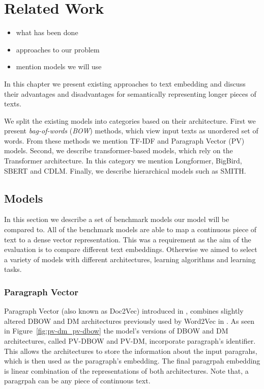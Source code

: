 \chapter{Related Work}

\begin{itemize}
    \item what has been done
    \item approaches to our problem
    \item mention models we will use
\end{itemize}

In this chapter we present existing approaches to text embedding and discuss
their advantages and disadvantages for semantically representing longer pieces
of texts.

We split the existing models into categories based on their architecture. First
we present \emph{bag-of-words} (\emph{BOW}) methods, which view input texts as
unordered set of words. From these methods we mention TF-IDF and Paragraph
Vector (PV) models. Second, we describe transformer-based models, which
rely on the Transformer architecture. In this category we mention Longformer,
BigBird, SBERT and CDLM. Finally, we describe hierarchical models such as SMITH.


\section{Models}

In this section we describe a set of benchmark models our model will be compared
to. All of the benchmark models are able to map a continuous piece of text to a
dense vector representation. This was a requirement as the aim of the evaluation
is to compare different text embeddings. Otherwise we aimed to select a variety
of models with different architectures, learning algorithms and learning tasks.

\subsection{Paragraph Vector}

Paragraph Vector (also known as Doc2Vec) introduced in \cite{le2014distributed},
combines slightly altered DBOW and DM architectures previously used by Word2Vec
in \cite{mikolov2013efficient}. As seen in Figure~\ref{fig:pv-dm_pv-dbow} the
model's versions of DBOW and DM architectures, called PV-DBOW and PV-DM,
incorporate paragraph's identifier. This allows the architectures to store the
information about the input paragrahs, which is then used as the paragraph's
embedding. The final paragrpah embedding is linear combination of the
representations of both architectures. Note that, a paragrpah can be any piece
of continuous text.

